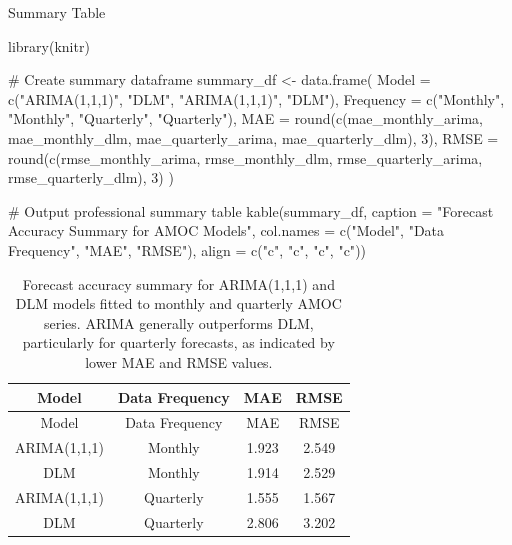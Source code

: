 \documentclass[
  11pt,
]{article}
\newenvironment{Shaded}{\begin{snugshade}}{\end{snugshade}}
\newcommand{\AttributeTok}[1]{\textcolor[rgb]{0.40,0.45,0.13}{#1}}
\newcommand{\CommentTok}[1]{\textcolor[rgb]{0.37,0.37,0.37}{#1}}
\newcommand{\DecValTok}[1]{\textcolor[rgb]{0.68,0.00,0.00}{#1}}
\newcommand{\FunctionTok}[1]{\textcolor[rgb]{0.28,0.35,0.67}{#1}}
\newcommand{\NormalTok}[1]{\textcolor[rgb]{0.00,0.23,0.31}{#1}}
\newcommand{\OtherTok}[1]{\textcolor[rgb]{0.00,0.23,0.31}{#1}}
\newcommand{\StringTok}[1]{\textcolor[rgb]{0.13,0.47,0.30}{#1}}
\begin{document}
Summary Table

\begin{Shaded}
\begin{Highlighting}[]
\FunctionTok{library}\NormalTok{(knitr)}

\CommentTok{\# Create summary dataframe}
\NormalTok{summary\_df }\OtherTok{\textless{}{-}} \FunctionTok{data.frame}\NormalTok{(}
  \AttributeTok{Model =} \FunctionTok{c}\NormalTok{(}\StringTok{"ARIMA(1,1,1)"}\NormalTok{, }\StringTok{"DLM"}\NormalTok{, }\StringTok{"ARIMA(1,1,1)"}\NormalTok{, }\StringTok{"DLM"}\NormalTok{),}
  \AttributeTok{Frequency =} \FunctionTok{c}\NormalTok{(}\StringTok{"Monthly"}\NormalTok{, }\StringTok{"Monthly"}\NormalTok{, }\StringTok{"Quarterly"}\NormalTok{, }\StringTok{"Quarterly"}\NormalTok{),}
  \AttributeTok{MAE =} \FunctionTok{round}\NormalTok{(}\FunctionTok{c}\NormalTok{(mae\_monthly\_arima, mae\_monthly\_dlm, mae\_quarterly\_arima, mae\_quarterly\_dlm), }\DecValTok{3}\NormalTok{),}
  \AttributeTok{RMSE =} \FunctionTok{round}\NormalTok{(}\FunctionTok{c}\NormalTok{(rmse\_monthly\_arima, rmse\_monthly\_dlm, rmse\_quarterly\_arima, rmse\_quarterly\_dlm), }\DecValTok{3}\NormalTok{)}
\NormalTok{)}

\CommentTok{\# Output professional summary table}
\FunctionTok{kable}\NormalTok{(summary\_df, }\AttributeTok{caption =} \StringTok{"Forecast Accuracy Summary for AMOC Models"}\NormalTok{,}
      \AttributeTok{col.names =} \FunctionTok{c}\NormalTok{(}\StringTok{"Model"}\NormalTok{, }\StringTok{"Data Frequency"}\NormalTok{, }\StringTok{"MAE"}\NormalTok{, }\StringTok{"RMSE"}\NormalTok{),}
      \AttributeTok{align =} \FunctionTok{c}\NormalTok{(}\StringTok{"c"}\NormalTok{, }\StringTok{"c"}\NormalTok{, }\StringTok{"c"}\NormalTok{, }\StringTok{"c"}\NormalTok{))}
\end{Highlighting}
\end{Shaded}

\begin{longtable}[]{@{}cccc@{}}
\caption{Forecast accuracy summary for ARIMA(1,1,1) and DLM models
fitted to monthly and quarterly AMOC series. ARIMA generally outperforms
DLM, particularly for quarterly forecasts, as indicated by lower MAE and
RMSE values.}\tabularnewline
\toprule\noalign{}
Model & Data Frequency & MAE & RMSE \\
\midrule\noalign{}
\endfirsthead
\toprule\noalign{}
Model & Data Frequency & MAE & RMSE \\
\midrule\noalign{}
\endhead
\bottomrule\noalign{}
\endlastfoot
ARIMA(1,1,1) & Monthly & 1.923 & 2.549 \\
DLM & Monthly & 1.914 & 2.529 \\
ARIMA(1,1,1) & Quarterly & 1.555 & 1.567 \\
DLM & Quarterly & 2.806 & 3.202 \\
\end{longtable}
\end{document}
